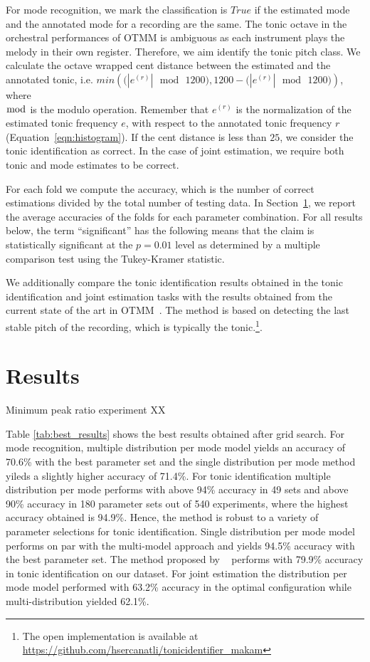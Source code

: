 \documentclass{sig-alternate}
\begin{document}
For mode recognition, we mark the classification is $True$ if the estimated mode and the annotated mode for a recording are the same. The tonic octave in the orchestral performances of OTMM is ambiguous as each instrument plays the melody in their own register. Therefore, we aim identify the tonic pitch class. We calculate the octave wrapped cent distance between the estimated and the annotated tonic, i.e. $min\left(\bigl(|e^{(r)}|\,\bmod\,1200\bigr), 1200-\bigl(|e^{(r)}|\,\bmod\,1200\bigl)\right)$, where \\$\bmod$ is the modulo operation. Remember that $e^{(r)}$ is the normalization of the estimated tonic frequency $e$, with respect to the annotated tonic frequency $r$ (Equation~\ref{eqn:histogram}). If the cent distance is less than $25$, we consider the tonic identification as correct. In the case of joint estimation, we require both tonic and mode estimates to be correct. 

For each fold we compute the accuracy, which is the number of correct estimations divided by the total number of testing data. In Section~\ref{sec:results}, we
report the average accuracies of the folds for each parameter combination. For all results below, the term ``significant'' has the following means that the claim is statistically significant at the $p = 0.01$ level as determined by a multiple comparison test using the Tukey-Kramer statistic.

We additionally compare the tonic identification results obtained in the tonic identification and joint estimation tasks with the results obtained from the current state of the art in OTMM~\cite{sercan_tonic}. The method is based on detecting the last stable pitch of the recording, which is typically the tonic.\footnote{The open implementation is available at \url{https://github.com/hsercanatli/tonicidentifier_makam}}.

\section{Results}\label{sec:results}
Minimum peak ratio experiment XX

Table \ref{tab:best_results} shows the best results obtained after grid search. For mode recognition, multiple distribution per mode model yields an accuracy of 70.6\% with the best parameter set and the single distribution per mode method yileds a slightly higher accuracy of 71.4\%. For tonic identification multiple distribution per mode performs with above 94\% accuracy in 49 sets and above 90\% accuracy in 180 parameter sets out of 540 experiments, where the highest accuracy obtained is 94.9\%. Hence, the method is robust to a variety of parameter selections for tonic identification. Single distribution per mode model performs on par with the multi-model approach and yields 94.5\% accuracy with the best parameter set. The method proposed by ~\cite{sercan_tonic} performs with 79.9\% accuracy in tonic identification on our dataset. For joint estimation the distribution per mode model performed with 63.2\% accuracy in the optimal configuration while multi-distribution yielded 62.1\%.
\end{document}
